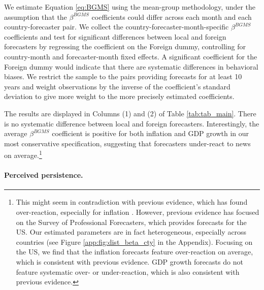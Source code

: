 We estimate Equation \eqref{eq:BGMS} using the mean-group methodology, under the assumption that the $\beta^{BGMS}$ coefficients could differ across each month and each country-forecaster pair. We collect the country-forecaster-month-specific $\beta^{BGMS}$ coefficients and test for significant differences between local and foreign forecasters by regressing the coefficient on the Foreign dummy, controlling for country-month and forecaster-month fixed effects. A significant coefficient for the Foreign dummy would indicate that there are systematic differences in behavioral biases. We restrict the sample to the pairs providing forecasts for at least 10 years and weight observations by the inverse of the coefficient's standard deviation to give more weight to the more precisely estimated coefficients.


The results are displayed in Columns (1) and (2) of Table \ref{tab:tab_main}. There is no systematic difference between local and foreign forecasters. Interestingly, the average $\beta^{BGMS}$ coefficient is positive for both inflation and GDP growth in our most conservative specification, suggesting that forecasters under-react to news on average.\footnote{This might seem in contradiction with previous evidence, which has found over-reaction, especially for inflation \citep{Bordaloetal2020,BroerKohlhas2019,Angeletosetal2020}. However, previous evidence has focused on the Survey of Professional Forecasters, which provides forecasts for the US. Our estimated parameters are in fact heterogeneous, especially across countries (see Figure \ref{app:fig:dist_beta_cty} in the Appendix). Focusing on the US, we find that the inflation forecasts feature over-reaction on average, which is consistent with previous evidence. GDP growth forecasts do not feature systematic over- or under-reaction, which is also consistent with previous evidence.}

\begin{landscape}
	\enlargethispage{2em}
	{
		
	}
\end{landscape}



\paragraph{Perceived persistence.}

